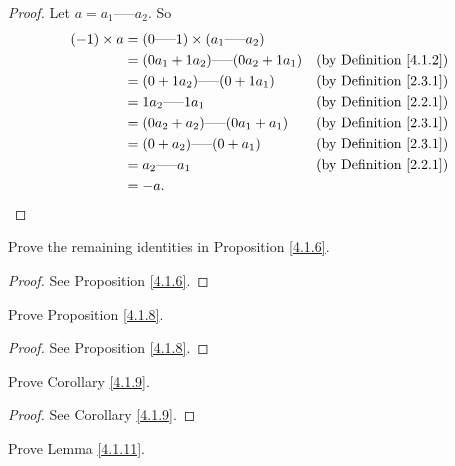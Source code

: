 \begin{proof}
    Let \(a = a_1 \text{-----} a_2\).
    So
    \begin{align*}
        (-1) \times a & = (0 \text{-----} 1) \times (a_1 \text{-----} a_2)                                      \\
                      & = (0a_1 + 1a_2) \text{-----} (0a_2 + 1a_1)         & \text{(by Definition \ref{4.1.2})} \\
                      & = (0 + 1a_2) \text{-----} (0 + 1a_1)               & \text{(by Definition \ref{2.3.1})} \\
                      & = 1a_2 \text{-----} 1a_1                           & \text{(by Definition \ref{2.2.1})} \\
                      & = (0a_2 + a_2) \text{-----} (0a_1 + a_1)           & \text{(by Definition \ref{2.3.1})} \\
                      & = (0 + a_2) \text{-----} (0 + a_1)                 & \text{(by Definition \ref{2.3.1})} \\
                      & = a_2 \text{-----} a_1                             & \text{(by Definition \ref{2.2.1})} \\
                      & = -a.
    \end{align*}
\end{proof}

\begin{exercise}\label{ex 4.1.4}
    Prove the remaining identities in Proposition \ref{4.1.6}.
\end{exercise}

\begin{proof}
    See Proposition \ref{4.1.6}.
\end{proof}

\begin{exercise}\label{ex 4.1.5}
    Prove Proposition \ref{4.1.8}.
\end{exercise}

\begin{proof}
    See Proposition \ref{4.1.8}.
\end{proof}

\begin{exercise}\label{ex 4.1.6}
    Prove Corollary \ref{4.1.9}.
\end{exercise}

\begin{proof}
    See Corollary \ref{4.1.9}.
\end{proof}

\begin{exercise}\label{ex 4.1.7}
    Prove Lemma \ref{4.1.11}.
\end{exercise}

